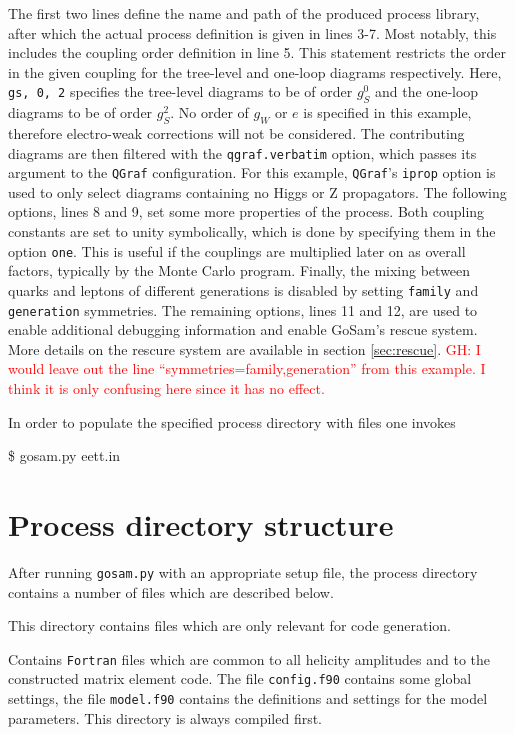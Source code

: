 \documentclass[11pt,a4paper]{refrep}
\newcommand{\gosam}{{\sc GoSam}\xspace}
\newcommand{\qgraf}{{\tt QGraf}\xspace}
\begin{document}
The first two lines define the name and path of the produced process library, after which the actual process definition is given in lines 3-7. Most notably, this includes the coupling order definition in line 5. This statement restricts the order in the given coupling for the tree-level and one-loop diagrams respectively. Here, \texttt{gs, 0, 2} specifies the tree-level diagrams to be of order $g_S^0$ and the one-loop diagrams to be of order $g_S^2$. No order of $g_W$ or $e$ is specified in this example, therefore electro-weak corrections will not be considered. The contributing diagrams are then filtered with the \texttt{qgraf.verbatim} option, which passes its argument to the \qgraf configuration. For this example, \qgraf's \texttt{iprop} option is used to only select diagrams containing no Higgs or Z propagators.
The following options, lines 8 and 9, set some more properties of the process. Both coupling constants are set to unity symbolically, which is done by specifying them in the option \texttt{one}. This is useful if the couplings are multiplied later on as overall factors, typically by the Monte Carlo program.
Finally, the mixing between quarks and leptons of different generations is disabled by setting \texttt{family} and \texttt{generation} symmetries. The remaining options, lines 11 and 12, are used to enable additional debugging information and enable \gosam's rescue system. More details on the rescure system are available in section \ref{sec:rescue}.
\textcolor{red}{GH: I would leave out the line ``symmetries=family,generation'' from this example. I think it is only confusing here since it has no effect.}

In order to populate the specified process directory with files
one invokes
\begin{example}
\$ gosam.py eett.in
\end{example}

\section{Process directory structure}



After running \texttt{gosam.py} with an appropriate setup file, the
process directory contains a number of files which are described below.

 This directory contains files which are only
relevant for code ge\-ne\-ration.

 Contains {\tt Fortran} files which are common to all helicity
amplitudes and to the constructed matrix element code. 
The file {\tt config.f90} contains some global  settings, the file {\tt model.f90}
contains the definitions and settings for the model parameters.
This directory is always compiled first.
\end{document}
